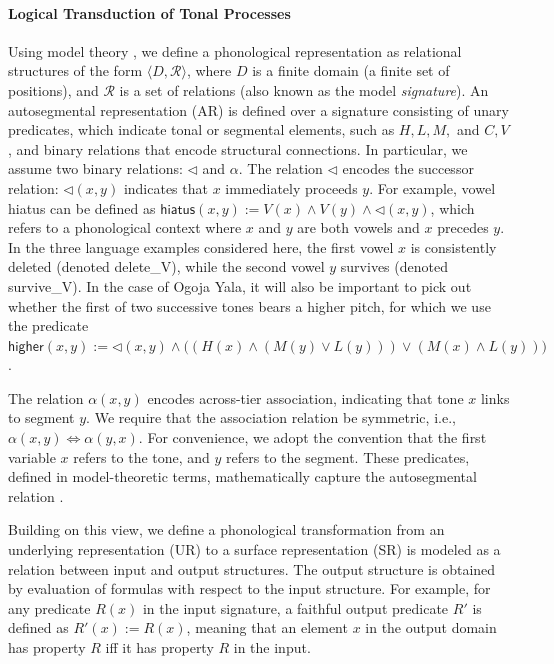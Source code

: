 \documentclass{article}[12pt]
\begin{document}
\paragraph{Logical Transduction of Tonal Processes}

Using model theory
\citep{strother2019diss,yolyan2025logical,jardine2017local,oakden2020notation,jardineDanis2021Qtheory,ChandleeJardine2021BMRS},
we define a phonological representation as relational structures of
the form $\langle D, \mathcal{R} \rangle$, where $D$ is a finite
domain (a finite set of positions), and $\mathcal{R}$ is a set of
relations (also known as the model \textit{signature}).  An
autosegmental representation (AR) is defined over a signature
consisting of unary predicates, which indicate tonal or segmental
elements, such as $H, L, M,$ and $C, V$, and binary relations that encode
structural connections. In particular, we assume two binary relations:
$\lhd$ and $\alpha$. The relation $\lhd$ encodes the successor
relation: $\lhd(x,y)$ indicates that $x$ immediately proceeds $y$. For
example, vowel hiatus can be defined as
$\textsf{hiatus}(x,y) := V(x) \land V(y) \land \lhd(x,y)$, which
refers to a phonological context where $x$ and $y$ are both vowels
and $x$ precedes $y$. In the three language examples considered here,
the first vowel $x$ is consistently deleted (denoted
\textsf{delete\_V}), while the second vowel $y$ survives (denoted
\textsf{survive\_V}). In the case of Ogoja Yala, it will also be
important to pick out whether the first of two successive tones bears
a higher pitch, for which we use the predicate
$\textsf{higher}(x,y) := \lhd(x,y) \land \big((H(x) \land (M(y) \lor L(y))) \lor (M(x)
\land L(y))\big)$. 

 The relation $\alpha(x,y)$ encodes across-tier 
association, indicating 
that tone $x$ links to segment $y$. We require that the association relation be symmetric, i.e.,
$\alpha(x, y) \iff \alpha(y, x)$.
For convenience, we adopt the convention that the first 
variable $x$ refers to the tone, and $y$ refers to the segment.
These predicates, defined 
in model-theoretic terms, mathematically capture the autosegmental relation \citep{goldsmith1976,coleman1991no}.

Building on this view, we define a phonological transformation 
from an underlying representation (UR) to a surface 
representation (SR) is modeled as a relation between input
and output structures.
The output structure is obtained by evaluation of formulas with 
respect to the input structure.
For example, for any predicate $R(x)$ in the input signature,
a faithful output predicate $R'$ is defined as $R'(x) := R(x)$,
meaning that an element $x$ in the output domain has property $R$
iff it has property $R$ in the input. 
\end{document}
